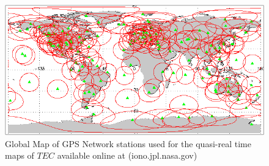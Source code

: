 \begin{figure}[htb]
\begin{center}
\includegraphics[width=0.95\linewidth]{Ionosphere/figures/gps_sitemap.png}
\caption{Global Map of GPS Network stations used for the quasi-real time maps of $TEC$ available online at (iono.jpl.nasa.gov)}
\label{Fig:gps_stat}
\end{center}
\end{figure}

